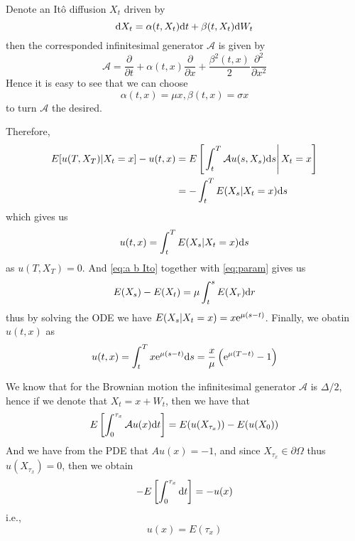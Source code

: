 \documentclass{homework}
\begin{document}
    \problem
    Denote an It\^o diffusion $X_t$ driven by
    \begin{equation}
        \label{eq:a b Ito}
        \mathrm d X_t=\alpha(t,X_t)\mathrm d t+\beta(t,X_t)\mathrm d W_t
    \end{equation}
    then the corresponded infinitesimal generator $\mathcal A$
    is given by
    \[\mathcal A=\frac{\partial}{\partial t}+\alpha(t,x)\frac{\partial}{\partial x}
    +\frac{\beta^2(t,x)}{2}\frac{\partial^2}{\partial x^2}\]
    Hence it is easy to see that we can choose
    \begin{equation}
        \label{eq:param}
        \alpha(t,x)=\mu x,\beta(t,x)=\sigma x
    \end{equation}
    to turn $\mathcal A$ the desired.

    Therefore,
    \[\begin{aligned}
        E[u(T,X_T)|X_t=x]-u(t,x)
        &=E\left[\left.\int_t^T\mathcal Au(s,X_s)\mathrm d s\right|
        X_t=x\right]\\
        &=-\int_t^TE(X_s|X_t=x)\mathrm d s
    \end{aligned}\]
    which gives us
    \[u(t,x)=\int_t^TE(X_s|X_t=x)\mathrm d s\]
    as $u(T,X_T)=0$.
    And \cref{eq:a b Ito} together with \cref{eq:param} gives us
    \[E(X_s)-E(X_t)=\mu\int_t^sE(X_r)\mathrm d r\]
    thus by solving the ODE we have $E(X_s|X_t=x)=x\mathrm e^{\mu(s-t)}$.
    Finally, we obatin $u(t,x)$ as
    \[u(t,x)=\int_t^Tx\mathrm e^{\mu(s-t)}\mathrm d s
    =\frac{x}{\mu}\left(\mathrm e^{\mu(T-t)}-1\right)\]

    \problem
    We know that for the Brownian motion the infinitesimal generator
    $\mathcal A$ is $\Delta/2$, hence if we denote that $X_t=x+W_t$, then
    we have that
    \[E\left[\int_0^{\tau_x}\mathcal Au(x)\mathrm d t\right]
    =E(u(X_{\tau_x}))-E(u(X_0))\]
    And we have from the PDE that $Au(x)=-1$,
    and since $X_{\tau_x}\in\partial\Omega$ thus $u(X_{\tau_x})=0$,
    then we obtain
    \[-E\left[\int_0^{\tau_x}\mathrm d t\right]=-u(x)\]
    i.e.,
    \[u(x)=E(\tau_x)\]
    
\end{document}
